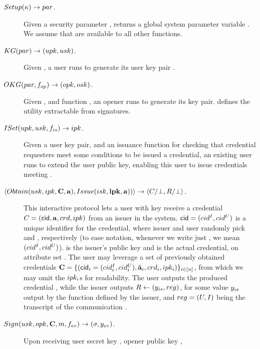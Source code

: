 \begin{description}
\item[$Setup(\kappa) \rightarrow par$.] Given a security parameter \secpar,
  returns a global system parameter variable \parm. We assume that \parm are
  available to all other functions.
\item[$\KeyGen(\parm) \rightarrow (%
  \upk,\usk)$.] Given \parm, a user
  runs \KeyGen to generate its user key pair%
  . 
\item[$OKG(par,f_{op}) \rightarrow (opk,osk)$.] Given \parm, and
  function \finsp, an opener runs \OKeyGen to generate its key pair. \finsp
  defines the utility extractable from signatures.
\item[$ISet(upk,usk,f_{is}) \rightarrow ipk$.] Given a user key
  pair, and an issuance function \fissue for checking that credential requesters
  meet some conditions to be issued a credential, an existing user runs \ISet to
  extend the user public key, enabling this user to issue credentials meeting
  \fissue.
\item[$\langle
  Obtain(usk,ipk,\mathbf{C},\mathbf{a}),
  Issue(isk,\mathbf{ipk},\mathbf{a}))  
  \rangle \rightarrow \langle C/\bot,R/\bot
  \rangle$.] %
  This interactive protocol lets a user with key \usk receive a credential
  $C=(\mathsf{cid},\mathbf{a},crd,ipk)$
  from an issuer in the system. $\mathsf{cid}=(cid^I,cid^U)$ is a unique identifier for
  the credential, where issuer and user randomly pick \cidi and \cidu,
  respectively (to ease notation, whenever we write just \cid, we mean $(cid^I,
  cid^U)$). \ipk is the issuer's public key and \cred is the actual credential,
  on attribute set \attrs. The user may leverage a set of previously obtained
  credentials $\mathbf{C}=\lbrace (\mathsf{cid}_i=(cid^I_i,cid^U_i),\tilde{\mathbf{a}}_i,crd_i,
  ipk_i)\rbrace_{i\in[n]}$, from which we may omit the $ipk_i$s for
  readability. The user outputs the produced credential \Cred, while the issuer
  outputs $R \gets (y_{is},reg)$, for some value $y_{is}$ output by
  the \fissue function defined by the issuer, and $reg=(U,I)$ being the
  transcript of the communication%
  .
\item[$Sign(usk,opk,\mathbf{C},m,f_{ev}) \rightarrow (\sigma,y_{ev})$.] %
  Upon receiving user secret key \usk, opener public key \opk, 

\end{description}
